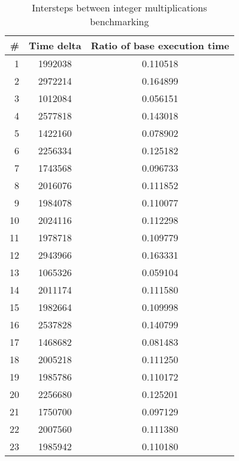 \begin{table}
\centering
\begin{tabular}{rcc}
\# & Time delta & Ratio of base execution time\\
\hline
1 & 1992038 & 0.110518 \\
2 & 2972214 & 0.164899 \\
3 & 1012084 & 0.056151 \\
4 & 2577818 & 0.143018 \\
5 & 1422160 & 0.078902 \\
6 & 2256334 & 0.125182 \\
7 & 1743568 & 0.096733 \\
8 & 2016076 & 0.111852 \\
9 & 1984078 & 0.110077 \\
10 & 2024116 & 0.112298 \\
11 & 1978718 & 0.109779 \\
12 & 2943966 & 0.163331 \\
13 & 1065326 & 0.059104 \\
14 & 2011174 & 0.111580 \\
15 & 1982664 & 0.109998 \\
16 & 2537828 & 0.140799 \\
17 & 1468682 & 0.081483 \\
18 & 2005218 & 0.111250 \\
19 & 1985786 & 0.110172 \\
20 & 2256680 & 0.125201 \\
21 & 1750700 & 0.097129 \\
22 & 2007560 & 0.111380 \\
23 & 1985942 & 0.110180 \\
\end{tabular}
\caption{Intersteps between integer multiplications benchmarking}
\end{table}
